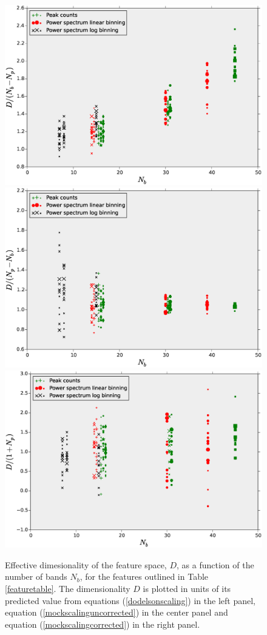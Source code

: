 \documentclass[reprint,aps,prd,superscriptaddress,showkeys,showpacs]{revtex4-1}
\begin{document}
\begin{figure}
\includegraphics[scale=0.3]{Figures/effective_nb.eps}
\includegraphics[scale=0.3]{Figures/effective_nb_fake_uncorrected.eps}
\includegraphics[scale=0.3]{Figures/effective_nb_fake_corrected.eps}
\caption{Effective dimesionality of the feature space, $D$, as a function of the number of bands $N_b$, for the features outlined in Table \ref{featuretable}. The dimensionality $D$ is plotted in units of its predicted value from equations (\ref{dodelsonscaling}) in the left panel, equation (\ref{mockscalinguncorrected}) in the center panel and equation (\ref{mockscalingcorrected}) in the right panel.}
\label{effectivenb}
\end{figure} 
\end{document}
